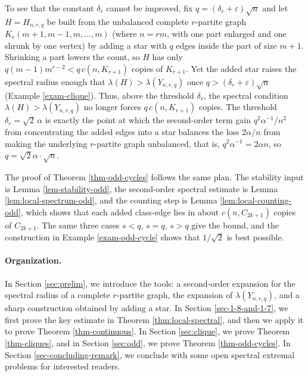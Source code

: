 \documentclass[11pt,a4paper]{article}
\theoremstyle{definition}
\theoremstyle{plain}
\newcommand{\eps}{\varepsilon}
\begin{document}
To see that the constant $\delta_r$ cannot be improved, fix
$q=(\delta_r+\eps)\sqrt n$ and let $H=H_{n,r,q}$ be built
from the unbalanced complete $r$-partite graph
$K_r(m+1,m-1,m,\ldots,m)$ (where $n=rm$, with one part
enlarged and one shrunk by one vertex) by adding a star
with $q$ edges inside the part of size $m+1$. Shrinking a
part lowers the count, so $H$ has only
$q(m-1)m^{r-2}<q\,c(n,K_{r+1})$ copies of $K_{r+1}$. Yet
the added star raises the spectral radius enough that
$\lambda(H)>\lambda(Y_{n,r,q})$ once
$q>(\delta_r+\eps)\sqrt n$ (Example \ref{exam-clique}). Thus, 
above the threshold $\delta_r$, the spectral condition $\lambda(H)>\lambda(Y_{n,r,q})$ no longer
forces $q\,c(n,K_{r+1})$ copies. 
The threshold $\delta_r=\sqrt2\,\alpha$ is exactly the point at which the second-order term gain $q^2\alpha^{-1}/n^2$ 
from concentrating the added edges into a star balances the loss $2\alpha /n$ from making the underlying $r$-partite graph unbalanced, that is, $q^2 \alpha^{-1}=2\alpha n$, so $q=\sqrt{2} \alpha  \cdot \sqrt{n}$.  


The proof of Theorem \ref{thm-odd-cycles} follows the same
plan. The stability input is Lemma \ref{lem-stability-odd},
the second-order spectral estimate is
Lemma \ref{lem:local-spectrum-odd}, and the counting step is
Lemma \ref{lem:local-counting-odd}, which shows that each
added class-edge lies in about $c(n,C_{2k+1})$ copies of
$C_{2k+1}$. The same three cases $s<q$, $s=q$, $s>q$ give
the bound, and the construction in
Example \ref{exam-odd-cycle} shows that $1/\sqrt2$ is best
possible. 





\paragraph{Organization.}  
In Section \ref{sec:prelim}, we introduce the tools: 
a second-order expansion for the spectral radius of a complete $r$-partite graph, 
the expansion of $\lambda(Y_{n,r,q})$, 
and a sharp construction obtained by adding a star. 
In Section \ref{sec-1-8-and-1-7}, 
we first prove the key estimate in Theorem \ref{thm:local-spectral}, and then we apply it to prove Theorem \ref{thm-continuous}. 
In Section \ref{sec:clique}, we prove
Theorem \ref{thm-cliques}, and in Section \ref{sec:odd}, we prove
Theorem \ref{thm-odd-cycles}. 
In Section \ref{sec-concluding-remark}, we conclude with some open spectral extremal problems for interested readers. 
\end{document}
